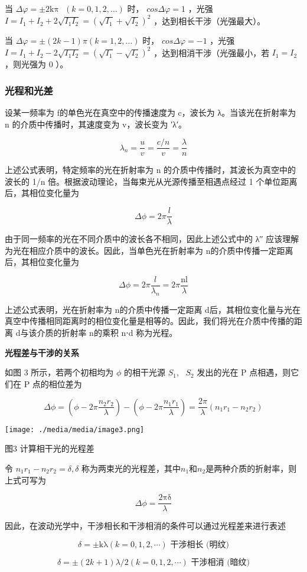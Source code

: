 \documentclass[
]{article}
\begin{document}
当 \(\Delta\varphi = \pm 2\text{kπ}\text{\ }(k = 0,1,2,\ldots)\) 时， \(cos\Delta\varphi = 1\) ，光强 \(I = I_{1} + I_{2} + 2\sqrt{I_{1}I_{2}} = \left( \sqrt{I_{1}} + \sqrt{I_{2}} \right)^{2}\) ，达到相长干涉（光强最大）。

当 \(\Delta\varphi = \pm (2k - 1)\pi(k = 1,2,\ldots)\) 时， \(cos\Delta\varphi = - 1\) ，光强 \(I = I_{1} + I_{2} - 2\sqrt{I_{1}I_{2}} = \left( \sqrt{I_{1}} - \sqrt{I_{2}} \right)^{2}\) ，达到相消干涉（光强最小，若 \(I_{1} = I_{2}\) ，则光强为 0 ）。

\hypertarget{ux5149ux7a0bux548cux5149ux5dee}{%
\subsubsection{光程和光差}\label{ux5149ux7a0bux548cux5149ux5dee}}

设某一频率为 f的单色光在真空中的传播速度为 c，波长为 λ。当该光在折射率为 n 的介质中传播时，其速度变为 v，波长变为 ′λ′。

\[\lambda_{n} = \frac{u}{v} = \frac{c/n}{v} = \frac{\lambda}{n}\]

上述公式表明，特定频率的光在折射率为 n 的介质中传播时，其波长为真空中的波长的 1/n\hspace{0pt} 倍。根据波动理论，当每束光从光源传播至相遇点经过 1 个单位距离后，其相位变化量为

\[\Delta\phi = 2\pi\frac{l}{\lambda}\]

由于同一频率的光在不同介质中的波长各不相同，因此上述公式中的 λ′′ 应该理解为光在相应介质中的波长。因此，当单色光在折射率为 n的介质中传播一定距离后，其相位变化量为

\[\Delta\phi = 2\pi\frac{l}{\lambda_{n}} = 2\pi\frac{\text{nl}}{\lambda}\]

上述公式表明，光在折射率为 n的介质中传播一定距离 d后，其相位变化量与光在真空中传播相同距离时的相位变化量是相等的。因此，我们将光在介质中传播的距离 d与该介质的折射率 n的乘积 n⋅d 称为光程。

\textbf{光程差与干涉的关系}

如图 3 所示，若两个初相均为 \(\phi\) 的相干光源 \(S_{1},\text{\ }S_{2}\) 发出的光在 P 点相遇，则它们在 P 点的相位差为

\[\Delta\phi = \left( \phi - 2\pi\frac{n_{2}r_{2}}{\lambda} \right) - \left( \phi - 2\pi\frac{n_{1}r_{1}}{\lambda} \right) = \frac{2\pi}{\lambda}\left( n_{1}r_{1} - n_{2}r_{2} \right)\]

\texttt{[image: ./media/media/image3.png]}

图3 计算相干光的光程差

令 \(n_{1}r_{1} - n_{2}r_{2} = \delta,\delta\) 称为两束光的光程差，其中\(n_{1}\)和\(n_{2}\)是两种介质的折射率，则上式可写为

\[\Delta\phi = \frac{2\text{πδ}}{\lambda}\]

因此，在波动光学中，干涉相长和干涉相消的条件可以通过光程差来进行表述

\[\delta = \pm \text{kλ}(k = 0,1,2,\cdots)\text{~}\text{干涉相长}\text{\ (}\text{明纹}\text{)}\]

\[\delta = \pm (2k + 1)\lambda/2(k = 0,1,2,\cdots)\text{~}\text{干涉相消}\text{\ (}\text{暗纹}\text{)}\]
\end{document}
